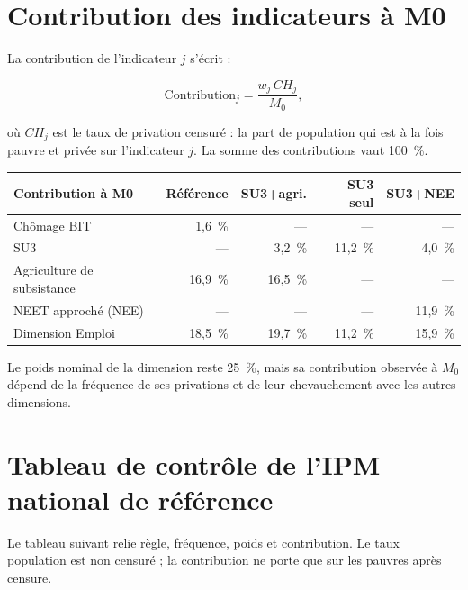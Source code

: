 \documentclass[11pt,a4paper]{article}
\begin{document}
\section{Contribution des indicateurs à M0}

La contribution de l'indicateur $j$ s'écrit :

\[
  \mathrm{Contribution}_j =
  \frac{w_j\,CH_j}{M_0},
\]

où $CH_j$ est le taux de privation censuré : la part de population qui est à la fois pauvre et
privée sur l'indicateur $j$. La somme des contributions vaut 100~\%.

\begin{center}
\small
\begin{tabular}{@{}lrrrr@{}}
\toprule
\textbf{Contribution à M0} & \textbf{Référence} & \textbf{SU3+agri.} &
\textbf{SU3 seul} & \textbf{SU3+NEE} \\
\midrule
Chômage BIT & 1,6~\% & --- & --- & --- \\
SU3 & --- & 3,2~\% & 11,2~\% & 4,0~\% \\
Agriculture de subsistance & 16,9~\% & 16,5~\% & --- & --- \\
NEET approché (NEE) & --- & --- & --- & 11,9~\% \\
\midrule
Dimension Emploi & 18,5~\% & 19,7~\% & 11,2~\% & 15,9~\% \\
\bottomrule
\end{tabular}
\end{center}

Le poids nominal de la dimension reste 25~\%, mais sa contribution observée à $M_0$ dépend de la
fréquence de ses privations et de leur chevauchement avec les autres dimensions.

\section{Tableau de contrôle de l'IPM national de référence}

Le tableau suivant relie règle, fréquence, poids et contribution. Le taux population est non
censuré ; la contribution ne porte que sur les pauvres après censure.
\end{document}
